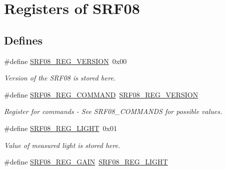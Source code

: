 \hypertarget{group___s_r_f08___r_e_g_i_s_t_e_r_s}{\section{\-Registers of \-S\-R\-F08}
\label{group___s_r_f08___r_e_g_i_s_t_e_r_s}
}
\subsection*{\-Defines}
\begin{DoxyCompactItemize}
\item 
\hypertarget{group___s_r_f08___r_e_g_i_s_t_e_r_s_ga47960835050dd16b6a3369227b3d8179}{\#define \hyperlink{group___s_r_f08___r_e_g_i_s_t_e_r_s_ga47960835050dd16b6a3369227b3d8179}{\-S\-R\-F08\-\_\-\-R\-E\-G\-\_\-\-V\-E\-R\-S\-I\-O\-N}~0x00}\label{group___s_r_f08___r_e_g_i_s_t_e_r_s_ga47960835050dd16b6a3369227b3d8179}

\begin{DoxyCompactList}\small\item\em \-Version of the \-S\-R\-F08 is stored here. \end{DoxyCompactList}\item 
\hypertarget{group___s_r_f08___r_e_g_i_s_t_e_r_s_ga63dda9c9fac527c2097116ad53461351}{\#define \hyperlink{group___s_r_f08___r_e_g_i_s_t_e_r_s_ga63dda9c9fac527c2097116ad53461351}{\-S\-R\-F08\-\_\-\-R\-E\-G\-\_\-\-C\-O\-M\-M\-A\-N\-D}~\hyperlink{group___s_r_f08___r_e_g_i_s_t_e_r_s_ga47960835050dd16b6a3369227b3d8179}{\-S\-R\-F08\-\_\-\-R\-E\-G\-\_\-\-V\-E\-R\-S\-I\-O\-N}}\label{group___s_r_f08___r_e_g_i_s_t_e_r_s_ga63dda9c9fac527c2097116ad53461351}

\begin{DoxyCompactList}\small\item\em \-Register for commands -\/ \-See \-S\-R\-F08\-\_\-\-C\-O\-M\-M\-A\-N\-D\-S for possible values. \end{DoxyCompactList}\item 
\hypertarget{group___s_r_f08___r_e_g_i_s_t_e_r_s_gaf2e557b72f14538a5a2e611700045edb}{\#define \hyperlink{group___s_r_f08___r_e_g_i_s_t_e_r_s_gaf2e557b72f14538a5a2e611700045edb}{\-S\-R\-F08\-\_\-\-R\-E\-G\-\_\-\-L\-I\-G\-H\-T}~0x01}\label{group___s_r_f08___r_e_g_i_s_t_e_r_s_gaf2e557b72f14538a5a2e611700045edb}

\begin{DoxyCompactList}\small\item\em \-Value of measured light is stored here. \end{DoxyCompactList}\item 
\hypertarget{group___s_r_f08___r_e_g_i_s_t_e_r_s_ga442609ae4e02b190250ea094a7d46a8f}{\#define \hyperlink{group___s_r_f08___r_e_g_i_s_t_e_r_s_ga442609ae4e02b190250ea094a7d46a8f}{\-S\-R\-F08\-\_\-\-R\-E\-G\-\_\-\-G\-A\-I\-N}~\hyperlink{group___s_r_f08___r_e_g_i_s_t_e_r_s_gaf2e557b72f14538a5a2e611700045edb}{\-S\-R\-F08\-\_\-\-R\-E\-G\-\_\-\-L\-I\-G\-H\-T}}\label{group___s_r_f08___r_e_g_i_s_t_e_r_s_ga442609ae4e02b190250ea094a7d46a8f}


\end{DoxyCompactItemize}
